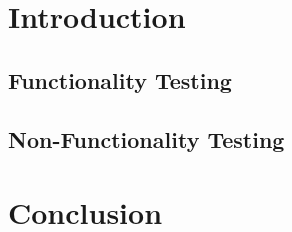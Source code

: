 \section{Introduction}
\subsection{Functionality Testing}
\subsection{Non-Functionality Testing}
\section{Conclusion}